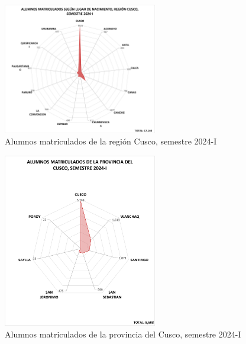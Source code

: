 \documentclass[
  12pt,
  letterpaper,
]{scrreprt}
\begin{document}
\begin{figure}[H]

\caption{Alumnos matriculados de la región Cusco, semestre 2024-I}

{\centering \includegraphics[width=0.6\textwidth,height=\textheight]{imagen/imagen8.png}

}

\end{figure}%
\begin{figure}[H]

\caption{Alumnos matriculados de la provincia del Cusco, semestre
2024-I}

{\centering \includegraphics[width=0.6\textwidth,height=\textheight]{imagen/imagen7.png}

}

\end{figure}%
\end{document}
